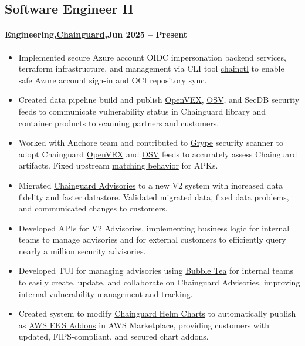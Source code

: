 \subsection{Software Engineer II}
\paragraph{Engineering,\href{https://www.chainguard.dev/}{Chainguard},Jun 2025 -- Present}
\begin{itemize}
    \item Implemented secure Azure account OIDC impersonation backend services, terraform infrastructure, and management via CLI tool \href{https://edu.chainguard.dev/chainguard/chainctl/}{chainctl} to enable safe Azure account sign-in and OCI repository sync.
    \item Created data pipeline build and publish \href{https://github.com/openvex}{OpenVEX}, \href{https://github.com/google/osv.dev}{OSV}, and SecDB security feeds to communicate vulnerability status in Chainguard library and container products to scanning partners and customers.
    \item Worked with Anchore team and contributed to \href{https://github.com/anchore/grype}{Grype} security scanner to adopt Chainguard \href{https://github.com/openvex}{OpenVEX} and \href{https://github.com/google/osv.dev}{OSV} feeds to accurately assess Chainguard artifacts. Fixed upstream \href{https://github.com/anchore/grype/commit/0f57388ec805c8a3a42e6a3bf375f50206141c19}{matching behavior} for APKs.
    \item Migrated \href{https://images.chainguard.dev/security}{Chainguard Advisories} to a new V2 system with increased data fidelity and faster datastore. Validated migrated data, fixed data problems, and communicated changes to customers.
    \item Developed APIs for V2 Advisories, implementing business logic for internal teams to manage advisories and for external customers to efficiently query nearly a million security advisories.
    \item Developed TUI for managing advisories using \href{https://github.com/charmbracelet/bubbletea}{Bubble Tea} for internal teams to easily create, update, and collaborate on Chainguard Advisories, improving internal vulnerability management and tracking.
    \item Created system to modify \href{https://images.chainguard.dev/directory/category/chart}{Chainguard Helm Charts} to automatically publish as \href{https://docs.aws.amazon.com/eks/latest/userguide/eks-add-ons.html}{AWS EKS Addons} in AWS Marketplace, providing customers with updated, FIPS-compliant, and secured chart addons.

\end{itemize}
